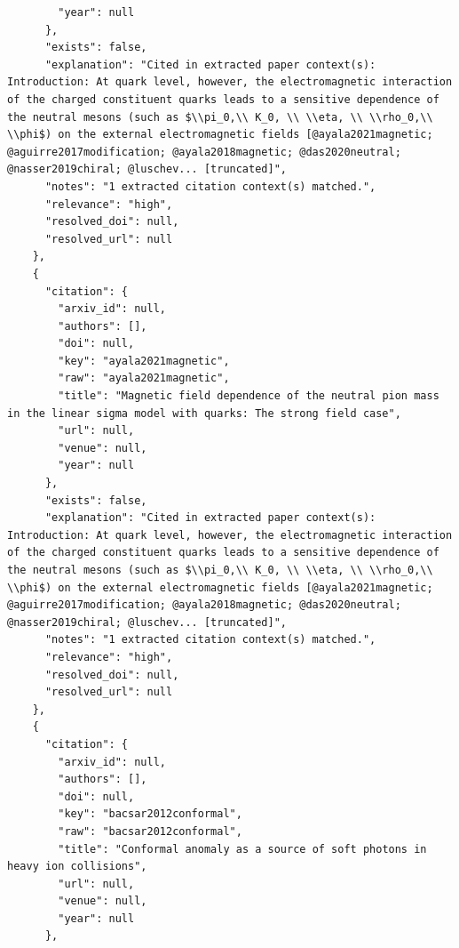 \documentclass[11pt]{article}
\begin{document}
\begin{verbatim}
        "year": null
      },
      "exists": false,
      "explanation": "Cited in extracted paper context(s): Introduction: At quark level, however, the electromagnetic interaction of the charged constituent quarks leads to a sensitive dependence of the neutral mesons (such as $\\pi_0,\\ K_0, \\ \\eta, \\ \\rho_0,\\ \\phi$) on the external electromagnetic fields [@ayala2021magnetic; @aguirre2017modification; @ayala2018magnetic; @das2020neutral; @nasser2019chiral; @luschev... [truncated]",
      "notes": "1 extracted citation context(s) matched.",
      "relevance": "high",
      "resolved_doi": null,
      "resolved_url": null
    },
    {
      "citation": {
        "arxiv_id": null,
        "authors": [],
        "doi": null,
        "key": "ayala2021magnetic",
        "raw": "ayala2021magnetic",
        "title": "Magnetic field dependence of the neutral pion mass in the linear sigma model with quarks: The strong field case",
        "url": null,
        "venue": null,
        "year": null
      },
      "exists": false,
      "explanation": "Cited in extracted paper context(s): Introduction: At quark level, however, the electromagnetic interaction of the charged constituent quarks leads to a sensitive dependence of the neutral mesons (such as $\\pi_0,\\ K_0, \\ \\eta, \\ \\rho_0,\\ \\phi$) on the external electromagnetic fields [@ayala2021magnetic; @aguirre2017modification; @ayala2018magnetic; @das2020neutral; @nasser2019chiral; @luschev... [truncated]",
      "notes": "1 extracted citation context(s) matched.",
      "relevance": "high",
      "resolved_doi": null,
      "resolved_url": null
    },
    {
      "citation": {
        "arxiv_id": null,
        "authors": [],
        "doi": null,
        "key": "bacsar2012conformal",
        "raw": "bacsar2012conformal",
        "title": "Conformal anomaly as a source of soft photons in heavy ion collisions",
        "url": null,
        "venue": null,
        "year": null
      },

\end{verbatim}
\end{document}

